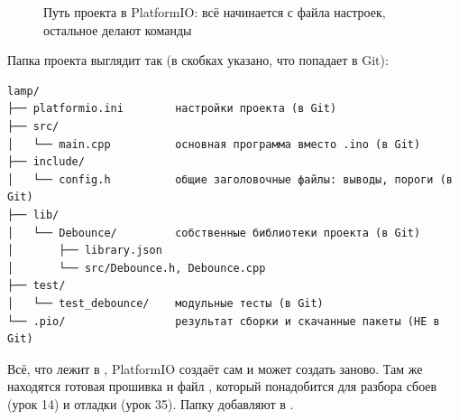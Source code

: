 \begin{figure}[H]
\centering
{}
\caption{Путь проекта в PlatformIO: всё начинается с файла настроек, остальное делают команды}
\end{figure}

Папка проекта выглядит так (в скобках указано, что попадает в Git):

\begin{Verbatim}[fontsize=\small,bgcolor=codebg]
lamp/
├── platformio.ini        настройки проекта (в Git)
├── src/
│   └── main.cpp          основная программа вместо .ino (в Git)
├── include/
│   └── config.h          общие заголовочные файлы: выводы, пороги (в Git)
├── lib/
│   └── Debounce/         собственные библиотеки проекта (в Git)
│       ├── library.json
│       └── src/Debounce.h, Debounce.cpp
├── test/
│   └── test_debounce/    модульные тесты (в Git)
└── .pio/                 результат сборки и скачанные пакеты (НЕ в Git)
\end{Verbatim}

Всё, что лежит в , PlatformIO создаёт сам и может создать заново. Там же находятся
готовая прошивка  и файл , который
понадобится для разбора сбоев (урок 14) и отладки (урок 35). Папку  добавляют
в .

